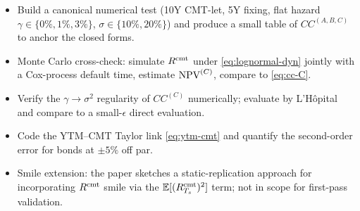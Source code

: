 \documentclass[11pt,a4paper]{article}
\begin{document}
\begin{todobox}
\begin{itemize}[noitemsep]
  \item Build a canonical numerical test (10Y CMT-let, 5Y fixing,
        flat hazard $\gamma \in \{0\%, 1\%, 3\%\}$, $\sigma \in
        \{10\%, 20\%\}$) and produce a small table of
        $CC^{(A,B,C)}$ to anchor the closed forms.
  \item Monte Carlo cross-check: simulate $R^{\mathrm{cmt}}$ under
        \eqref{eq:lognormal-dyn} jointly with a Cox-process default
        time, estimate $\mathrm{NPV}^{(C)}$, compare to \eqref{eq:cc-C}.
  \item Verify the $\gamma \to \sigma^2$ regularity of $CC^{(C)}$
        numerically; evaluate by L'H\^opital and compare to a
        small-$\epsilon$ direct evaluation.
  \item Code the YTM--CMT Taylor link \eqref{eq:ytm-cmt} and quantify
        the second-order error for bonds at $\pm 5\%$ off par.
  \item Smile extension: the paper sketches a static-replication
        approach for incorporating $R^{\mathrm{cmt}}$ smile via the
        $\mathbb{E}[(R^{\mathrm{cmt}}_{T_s})^2]$ term; not in scope for
        first-pass validation.
\end{itemize}
\end{todobox}
\end{document}
